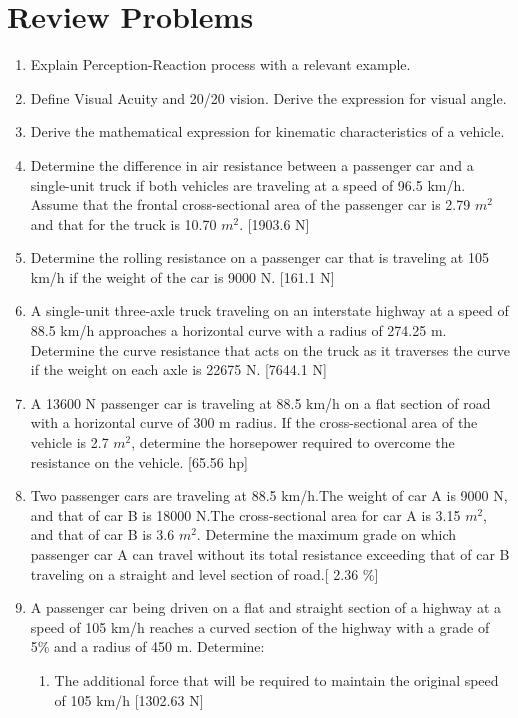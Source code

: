 \section{Review Problems}
\begin{enumerate}
	\item  Explain Perception-Reaction process with a relevant example.
	\item  Define Visual Acuity and 20/20 vision. Derive the expression for visual angle.
	\item  Derive the mathematical expression for kinematic characteristics of a vehicle.
	\item Determine the difference in air resistance between a passenger car and a single-unit truck if both vehicles are traveling at a speed of 96.5 km/h. Assume that the frontal cross-sectional area of the passenger car is 2.79 $ m^2 $ and that for the truck is 10.70 $ m^2 $. [1903.6 N]
	\item Determine the rolling resistance on a passenger car that is traveling at 105 km/h if the weight of the car is 9000 N. [161.1 N]
	\item A single-unit three-axle truck traveling on an interstate highway at a speed of 88.5 km/h approaches a horizontal curve with a radius of 274.25 m. Determine the curve resistance that acts on the truck as it traverses the curve if the weight on each axle is 22675 N. [7644.1 N]
	\item A 13600 N passenger car is traveling at 88.5 km/h on a flat section of road with a horizontal curve of 300 m radius. If the cross-sectional area of the vehicle is 2.7 $ m^2 $, determine the horsepower required to overcome the resistance on the vehicle. [65.56 hp]
	\item Two passenger cars are traveling at 88.5 km/h.The weight of car A is 9000 N, and that of car B is 18000 N.The cross-sectional area for car A is 3.15 $ m^2 $, and that of car B is 3.6 $ m^2 $. Determine the maximum grade on which passenger car A can travel without its total resistance exceeding that of car B traveling on a straight and level section of road.[ 2.36 \%]
	\item A passenger car being driven on a flat and straight section of a highway at a speed of 105 km/h reaches a curved section of the highway with a grade of 5\% and a radius of 450 m. Determine:
		\begin{enumerate}
			\item The additional force that will be required to maintain the original speed of 105 km/h [1302.63 N]

\end{enumerate}
\end{enumerate}
